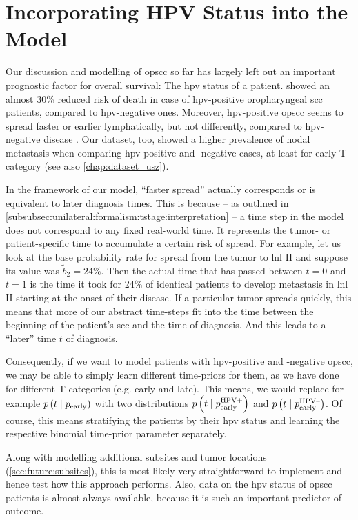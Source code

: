 \documentclass[\relativeRoot/main.tex]{subfiles}
\begin{document}
\section{Incorporating HPV Status into the Model}
\label{sec:future:hpv}

Our discussion and modelling of \gls{opscc} so far has largely left out an important prognostic factor for overall survival: The \gls{hpv} status of a patient.  showed an almost 30\% reduced risk of death in case of \gls{hpv}-positive oropharyngeal \gls{scc} patients, compared to \gls{hpv}-negative ones. Moreover, \gls{hpv}-positive \gls{opscc} seems to spread faster or earlier lymphatically, but not differently, compared to \gls{hpv}-negative disease \cite{bauwens_prevalence_2021}. Our dataset, too, showed a higher prevalence of nodal metastasis when comparing \gls{hpv}-positive and -negative cases, at least for early T-category \cite{ludwig_detailed_2021} (see also \cref{chap:dataset_usz}).

In the framework of our model, ``faster spread'' actually corresponds or is equivalent to later diagnosis times. This is because -- as outlined in \cref{subsubsec:unilateral:formalism:tstage:interpretation} -- a time step in the model does not correspond to any fixed real-world time. It represents the tumor- or patient-specific time to accumulate a certain risk of spread. For example, let us look at the base probability rate for spread from the tumor to \gls{lnl} II and suppose its value was $\tilde{b}_2 = 24\%$. Then the actual time that has passed between $t=0$ and $t=1$ is the time it took for 24\% of identical patients to develop metastasis in \gls{lnl} II starting at the onset of their disease. If a particular tumor spreads quickly, this means that more of our abstract time-steps fit into the time between the beginning of the patient's \gls{scc} and the time of diagnosis. And this leads to a ``later'' time $t$ of diagnosis.

Consequently, if we want to model patients with \gls{hpv}-positive and -negative \gls{opscc}, we may be able to simply learn different time-priors for them, as we have done for different T-categories (e.g. early and late). This means, we would replace for example $p \left( t \mid p_\text{early} \right)$ with two distributions $p \left( t \mid p_\text{early}^\text{HPV+} \right)$ and $p \left( t \mid p_\text{early}^\text{HPV--} \right)$. Of course, this means stratifying the patients by their \gls{hpv} status and learning the respective binomial time-prior parameter separately.

Along with modelling additional subsites and tumor locations (\cref{sec:future:subsites}), this is most likely very straightforward to implement and hence test how this approach performs. Also, data on the \gls{hpv} status of \gls{opscc} patients is almost always available, because it is such an important predictor of outcome.
\end{document}
